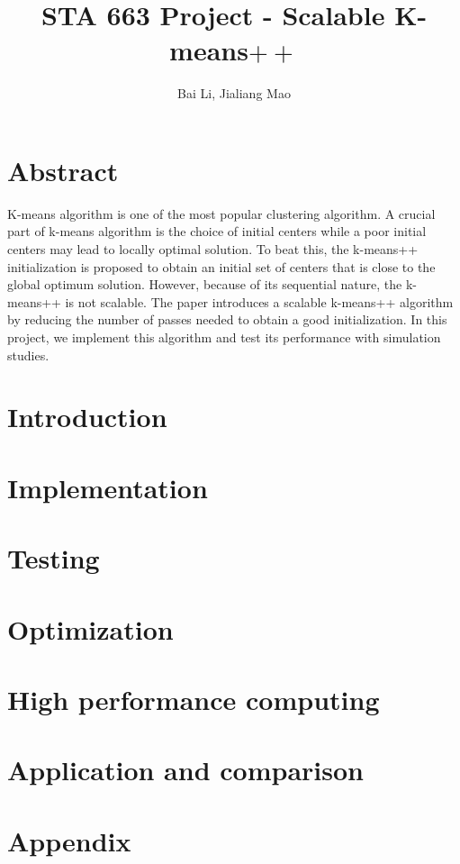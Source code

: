 \documentclass[11pt]{article}
\begin{document}
\vspace{-1in}
\title{\bf STA 663 Project - Scalable K-means$++$}
\author{Bai Li, Jialiang Mao}
\maketitle  
 

 
\section*{Abstract}
K-means algorithm is one of the most popular clustering algorithm. A crucial part of k-means algorithm is the choice of initial centers while a poor initial centers may lead to locally optimal solution. To beat this, the k-means++ initialization is proposed to obtain an initial set of centers that is close to the global optimum solution. However, because of its sequential nature, the k-means++ is not scalable. The paper introduces a scalable k-means++ algorithm by reducing the number of passes needed to obtain a good initialization. In this project, we implement this algorithm and test its performance with simulation studies.

  
\section{Introduction}






\section{Implementation}


\section{Testing}

\section{Optimization}

\section{High performance computing}

\section{Application and comparison}
\clearpage
\newpage




\section*{Appendix}
\clearpage
\newpage
\end{document}
